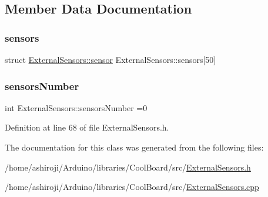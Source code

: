 \subsection{Member Data Documentation}
\mbox{\label{class_external_sensors_a284233f884fcf00154a44740cf1d9e1e}} 
\subsubsection{\texorpdfstring{sensors}{sensors}}
{\footnotesize\ttfamily struct \hyperlink{struct_external_sensors_1_1sensor}{External\+Sensors\+::sensor} External\+Sensors\+::sensors\mbox{[}50\mbox{]}\hspace{0.3cm}{\ttfamily [private]}}

\mbox{\label{class_external_sensors_a58e4fbf9adeae787d92be5fa33043b5d}} 
\subsubsection{\texorpdfstring{sensors\+Number}{sensorsNumber}}
{\footnotesize\ttfamily int External\+Sensors\+::sensors\+Number =0\hspace{0.3cm}{\ttfamily [private]}}



Definition at line 68 of file External\+Sensors.\+h.



The documentation for this class was generated from the following files\+:\begin{DoxyCompactItemize}
\item 
/home/ashiroji/\+Arduino/libraries/\+Cool\+Board/src/\hyperlink{_external_sensors_8h}{External\+Sensors.\+h}\item 
/home/ashiroji/\+Arduino/libraries/\+Cool\+Board/src/\hyperlink{_external_sensors_8cpp}{External\+Sensors.\+cpp}\end{DoxyCompactItemize}
